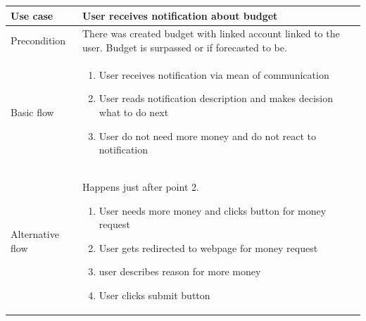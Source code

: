 \documentclass[licencjacka,en]{thesisclass}
\begin{document}
    \begin{center}
      \begin{tabular} {| l | p{13cm} |}
      \hline
      Use case & User receives notification about budget \\ \hline
      Precondition & There was created budget with linked account linked to the user. Budget is surpassed or if forecasted to be.  \\ \hline

      Basic flow &
        \begin{enumerate}
        \item User receives notification via mean of communication
        \item User reads notification description and makes decision what to do next
        \item User do not need more money and do not react to notification
        \end{enumerate}
        \\ \hline
      Alternative flow &
        Happens just after point 2.
        \begin{enumerate}
        \item User needs more money and clicks button for money request
        \item User gets redirected to webpage for money request
        \item user describes reason for more money
        \item User clicks submit button
        \end{enumerate}
        \\ \hline
      \end{tabular}
    \end{center}
\end{document}
